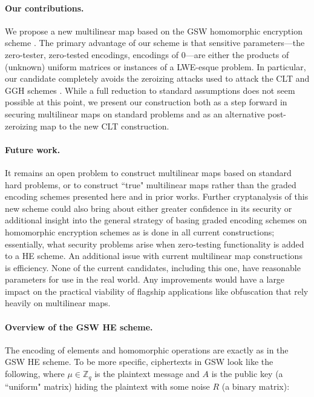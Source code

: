 \paragraph{Our contributions.}  We propose a new multilinear map based on the GSW homomorphic encryption scheme \cite{gsw}.  The primary advantage of our scheme is that sensitive parameters---the zero-tester, zero-tested encodings, encodings of $0$---are either the products of (unknown) uniform matrices or instances of a LWE-esque problem.  In particular, our candidate completely avoids the zeroizing attacks used to attack the CLT and GGH schemes \cite{chl, cgh, hj}.  While a full reduction to standard assumptions does not seem possible at this point, we present our construction both as a step forward in securing multilinear maps on standard problems and as an alternative post-zeroizing map to the new CLT construction.

\paragraph{Future work.}  It remains an open problem to construct multilinear maps based on standard hard problems, or to construct ``true" multilinear maps rather than the graded encoding schemes presented here and in prior works.  Further cryptanalysis of this new scheme could also bring about either greater confidence in its security or additional insight into the general strategy of basing graded encoding schemes on homomorphic encryption schemes as is done in all current constructions; essentially, what security problems arise when zero-testing functionality is added to a HE scheme.  An additional issue with current multilinear map constructions is efficiency.  None of the current candidates, including this one, have reasonable parameters for use in the real world.  Any improvements would have a large impact on the practical viability of flagship applications like obfuscation that rely heavily on multilinear maps.

\paragraph{Overview of the GSW HE scheme.}  The encoding of elements and homomorphic operations are exactly as in the GSW HE scheme.  To be more specific, ciphertexts in GSW look like the following, where $\mu \in \mathbb{Z}_q$ is the plaintext message and $A$ is the public key (a ``uniform" matrix) hiding the plaintext with some noise $R$ (a binary matrix):

